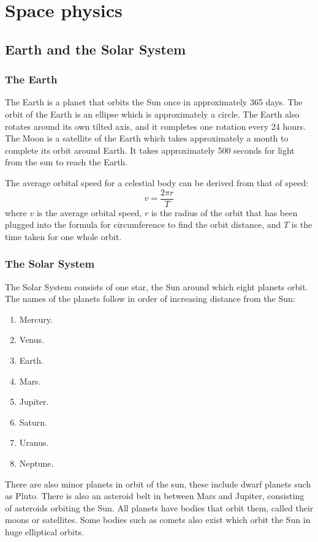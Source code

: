 \section{Space physics}
\subsection{Earth and the Solar System}
\subsubsection{The Earth}

The Earth is a planet that orbits the Sun once in approximately 365 days. The orbit of the Earth
is an ellipse which is approximately a circle. The Earth also rotates around its own tilted axis,
and it completes one rotation every 24 hours. The Moon is a satellite of the Earth which takes
approximately a month to complete its orbit around Earth. It takes approximately 500 seconds for
light from the sun to reach the Earth.

The average orbital speed for a celestial body can be derived from that of speed:
$$ v = \frac{2\pi r}{T} $$
where $v$ is the average orbital speed, $r$ is the radius of the orbit that has been plugged into
the formula for circumference to find the orbit distance, and $T$ is the time taken for one whole
orbit.

\subsubsection{The Solar System}

The Solar System consists of one star, the Sun around which eight planets orbit. The names of the
planets follow in order of increasing distance from the Sun:
\begin{enumerate}
	\item Mercury.
	\item Venus.
	\item Earth.
	\item Mars.
	\item Jupiter.
	\item Saturn.
	\item Uranus.
	\item Neptune.
\end{enumerate}

There are also minor planets in orbit of the sun, these include dwarf planets such as Pluto. There
is also an asteroid belt in between Mars and Jupiter, consisting of asteroids orbiting the Sun. All
planets have bodies that orbit them, called their moons or satellites. Some bodies such as comets
also exist which orbit the Sun in huge elliptical orbits.

